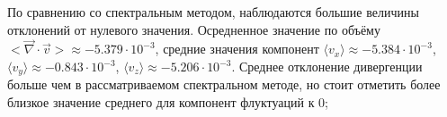 По сравнению со спектральным методом, наблюдаются большие величины отклонений от нулевого значения. Осредненное значение по объёму $<\vec \nabla \cdot \vec v> \approx -5.379 \cdot 10^{-3}$, средние значения компонент $\langle v_x \rangle \approx -5.384 \cdot 10^{-3}$, $\langle v_y \rangle \approx -0.843 \cdot 10^{-3} $, $\langle v_z \rangle \approx -5.206 \cdot 10^{-3}$. Среднее отклонение дивергенции больше чем в рассматриваемом спектральном методе, но стоит отметить более близкое значение среднего для компонент флуктуаций к 0;
